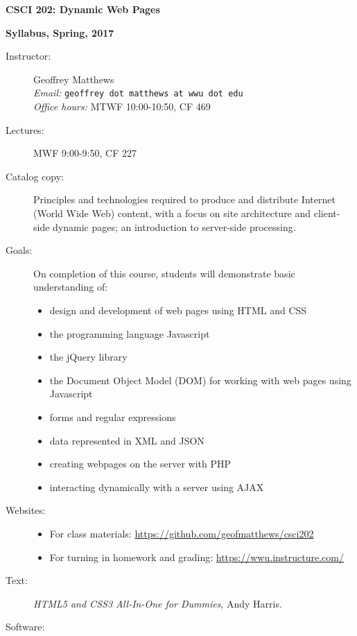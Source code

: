 \documentclass{article}
\begin{document}
\centerline{\Large\bf CSCI 202: Dynamic Web Pages}
\centerline{\large\bf Syllabus, Spring, 2017}


\begin{description}


\item[Instructor:] Geoffrey Matthews\\
{\em Email:} {\tt geoffrey dot matthews at wwu dot edu}\\
{\em Office hours:} MTWF 10:00-10:50, CF 469


\item[Lectures:] MWF 9:00-9:50, CF 227


\item[Catalog copy:] Principles and technologies required to produce
  and distribute Internet (World Wide Web) content, with a focus on
  site architecture and client-side dynamic pages; an introduction to
  server-side processing. 


\item[Goals:]  On completion of this course, students will demonstrate
  basic understanding of:
\begin{itemize}
\item design and development of web pages using HTML and CSS
\item the programming language Javascript
\item the jQuery library
\item the Document Object Model (DOM) for working with web pages using
  Javascript
\item forms and regular expressions
\item data represented in XML and JSON
\item creating webpages on the server with PHP
\item interacting dynamically with a server using AJAX
\end{itemize}


\item[Websites:]\mbox{}
\begin{itemize}
  \item For class materials:
    \url{https://github.com/geofmatthews/csci202} 
  \item For turning in homework and grading:
    \url{https://wwu.instructure.com/}  
\end{itemize}

\item[Text:] {\em HTML5 and CSS3 All-In-One for Dummies}, Andy Harris.

\item[Software:]\mbox{}
  

\end{description}
\end{document}
